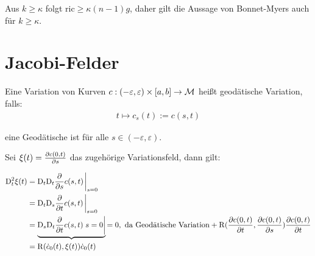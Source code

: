 \begin{bem}
Aus $k \geq \kappa$ folgt $\text{ric} \geq \kappa (n-1)g$,
daher gilt die Aussage von Bonnet-Myers auch für $k \geq \kappa$.


\section{Jacobi-Felder}

\begin{defs}
Eine Variation von Kurven 
$c: (-\varepsilon, \varepsilon) \times [a , b] \to \mathcal{M}$
heißt geodätische Variation, falls:
\begin{align*}
    t \mapsto c_s(t) := c(s, t)
\end{align*}

eine Geodätische ist für alle $s\in (-\varepsilon, \varepsilon)$.
\end{defs}

Sei $\xi (t) = \pdv{c(0,t)}{s}$ das zugehörige Variationsfeld, dann gilt:

\begin{align*}
\covd^2_t \xi (t) &= \covd_t \covd_t \pdv{s} c(s, t) \eval_{s=0}\\
&= \covd_t \covd_s \pdv{t} c(s, t) \eval_{s=0}\\
&= \underbrace{\covd_s \covd_t \pdv{t} c(s, t) \eval{s=0}}
{=0, \ \text{da Geodätische Variation}} + 
\curv (\pdv{c(0, t)}{t} , \pdv{c(0, t)}{s}) \pdv{c(0,t)}{t}\\
&= \curv ( \dot{c}_0 (t) , \xi (t)) \dot{c}_0 (t)
\end{align*}

\end{bem}
